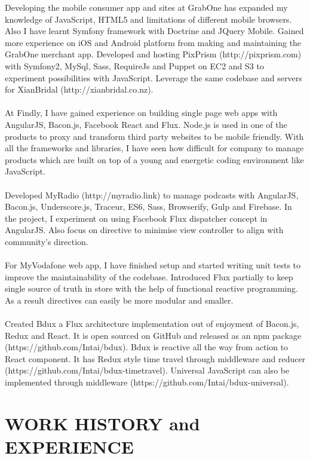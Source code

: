 \begin{resume}
Developing the mobile consumer app and sites at GrabOne has expanded my knowledge of JavaScript, HTML5 and limitations of different mobile browsers. Also I have learnt Symfony framework with Doctrine and JQuery Mobile. Gained more experience on iOS and Android platform from making and maintaining the GrabOne merchant app.
\newpage
Developed and hosting PixPrism (http://pixprism.com) with Symfony2, MySql, Sass, RequireJs and Puppet on EC2 and S3 to experiment possibilities with JavaScript. Leverage the same codebase and servers for XianBridal (http://xianbridal.co.nz).
\\\\
At Findly, I have gained experience on building single page web apps with AngularJS, Bacon.js, Facebook React and Flux. Node.js is used in one of the products to proxy and transform third party websites to be mobile friendly. With all the frameworks and libraries, I have seen how difficult for company to manage products which are built on top of a young and energetic coding environment like JavaScript.
\\\\
Developed MyRadio (http://myradio.link) to manage podcasts with AngularJS, Bacon.js, Underscore.js, Traceur, ES6, Sass, Browserify, Gulp and Firebase. In the project, I experiment on using Facebook Flux dispatcher concept in AngularJS. Also focus on directive to minimise view controller to align with community's direction.
\\\\
For MyVodafone web app, I have finished setup and started writing unit tests to improve the maintainability of the codebase. Introduced Flux partially to keep single source of truth in store with the help of functional reactive programming. As a result directives can easily be more modular and smaller.
\\\\
Created Bdux a Flux architecture implementation out of enjoyment of Bacon.js, Redux and React. It is open sourced on GitHub and released as an npm package (https://github.com/Intai/bdux). Bdux is reactive all the way from action to React component. It has Redux style time travel through middleware and reducer (https://github.com/Intai/bdux-timetravel). Universal JavaScript can also be implemented through middleware (https://github.com/Intai/bdux-universal).

\section{WORK HISTORY and EXPERIENCE} 
\vspace{0.15in} 


\end{resume}
